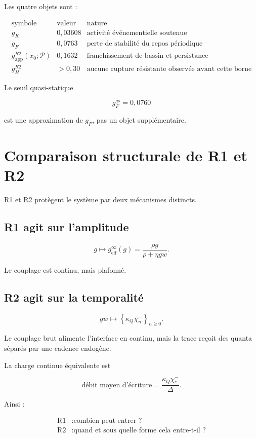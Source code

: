 Les quatre objets sont :

\[
\begin{array}{c|c|l}
\text{symbole}
&
\text{valeur}
&
\text{nature}
\\
\hline
g_K
&
0{,}03608
&
\text{activité événementielle soutenue}
\\
g_F
&
0{,}0763
&
\text{perte de stabilité du repos périodique}
\\
g_{\mathrm{app}}^{R2}(x_0;\mathcal P)
&
0{,}1632
&
\text{franchissement de bassin et persistance}
\\
g_H^{R2}
&
>0{,}30
&
\text{aucune rupture résistante observée avant cette borne}
\end{array}
\]

Le seuil quasi-statique

\[
g_F^{qs}=0{,}0760
\]

est une approximation de \(g_F\), pas un objet supplémentaire.

\section{Comparaison structurale de R1 et R2}
\label{annexe-interfaces-comparaison}

R1 et R2 protègent le système par deux mécanismes distincts.

\subsection{R1 agit sur l'amplitude}

\[
g
\longmapsto
g_{\mathrm{eff}}^\infty(g)
=
\frac{\rho g}{\rho+\eta gw}.
\]

Le couplage est continu, mais plafonné.

\subsection{R2 agit sur la temporalité}

\[
gw
\longmapsto
\left\{
\kappa_Q\chi_n^-
\right\}_{n\geq0}.
\]

Le couplage brut alimente l'interface en continu, mais la trace reçoit
des quanta séparés par une cadence endogène.

La charge continue équivalente est

\[
\boxed{
\text{débit moyen d'écriture}
=
\frac{\kappa_Q\chi_\ast^-}{\Delta}.
}
\]

Ainsi :

\[
\boxed{
\begin{aligned}
\text{R1}
&:
\text{combien peut entrer ?}
\\
\text{R2}
&:
\text{quand et sous quelle forme cela entre-t-il ?}
\end{aligned}
}
\]

